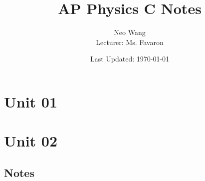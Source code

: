\documentclass{scrreprt}
\title{AP Physics C Notes}
\author{Neo Wang \\ Lecturer: Ms. Favaron}
\date{Last Updated: \today}
\begin{document}
\maketitle
\setcounter{tocdepth}{2}
\tableofcontents

\section{Unit 01}


\section{Unit 02}
\subsection{Notes}


\end{document}
